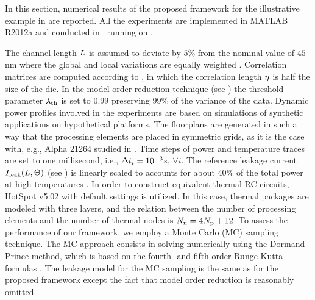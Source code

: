 In this section, numerical results of the proposed framework for the illustrative example in  are reported. All the experiments are implemented in MATLAB R2012a \cite{matlab} and conducted in \hostOS\ running on \hostHardware.

The channel length $L$ is assumed to deviate by $5\%$ from the nominal value of $45$ nm where the global and local variations are equally weighted \cite{juan2011, juan2012}. Correlation matrices are computed according to , in which the correlation length $\eta$ is half the size of the die. In the model order reduction technique (see ) the threshold parameter $\lambda_\text{th}$ is set to $0.99$ preserving $99\%$ of the variance of the data. Dynamic power profiles involved in the experiments are based on simulations of synthetic applications on hypothetical platforms. The floorplans are generated in such a way that the processing elements are placed in symmetric grids, as it is the case with, e.g., Alpha 21264 studied in \cite{juan2011}. Time steps of power and temperature traces are set to one millisecond, i.e., $\Delta t_i = 10^{-3}$s, $\forall i$. The reference leakage current $I_{\text{leak}}(L, \Theta)$ (see ) is linearly scaled to accounts for about $40\%$ of the total power at high temperatures \cite{liu2007}. In order to construct equivalent thermal RC circuits, HotSpot v5.02 \cite{hotspot} with default settings is utilized. In this case, thermal packages are modeled with three layers, and the relation between the number of processing elements and the number of thermal nodes is $N_\text{n} = 4 {N_\text{p}} + 12$. To assess the performance of our framework, we employ a Monte Carlo (MC) sampling technique. The MC approach consists in solving  numerically using the Dormand-Prince method, which is based on the fourth- and fifth-order Runge-Kutta formulas \cite{press2007}. The leakage model for the MC sampling is the same as for the proposed framework except the fact that model order reduction is reasonably omitted.

